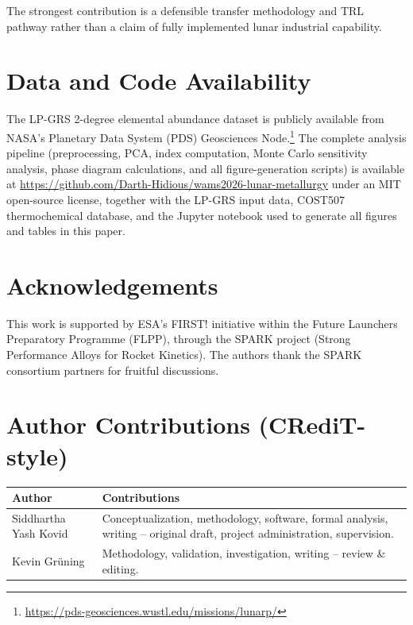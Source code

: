 \documentclass[11pt,a4paper]{article}
\begin{document}
The strongest contribution is a defensible transfer methodology and TRL pathway rather than a claim of fully implemented lunar industrial capability.

\section*{Data and Code Availability}

The LP-GRS 2-degree elemental abundance dataset is publicly available from NASA's Planetary Data System (PDS) Geosciences Node.\footnote{\url{https://pds-geosciences.wustl.edu/missions/lunarp/}} The complete analysis pipeline (preprocessing, PCA, index computation, Monte Carlo sensitivity analysis, phase diagram calculations, and all figure-generation scripts) is available at \url{https://github.com/Darth-Hidious/wams2026-lunar-metallurgy} under an MIT open-source license, together with the LP-GRS input data, COST507 thermochemical database, and the Jupyter notebook used to generate all figures and tables in this paper.

\section*{Acknowledgements}

This work is supported by ESA's FIRST! initiative within the Future Launchers Preparatory Programme (FLPP), through the SPARK project (Strong Performance Alloys for Rocket Kinetics). The authors thank the SPARK consortium partners for fruitful discussions.

\section*{Author Contributions (CRediT-style)}

\begin{longtable}{p{3.4cm} p{10.6cm}}
\toprule
\textbf{Author} & \textbf{Contributions} \\
\midrule
Siddhartha Yash Kovid & Conceptualization, methodology, software, formal analysis, writing -- original draft, project administration, supervision. \\
Kevin Gr\"uning & Methodology, validation, investigation, writing -- review \& editing. \\
\bottomrule
\end{longtable}
\end{document}
